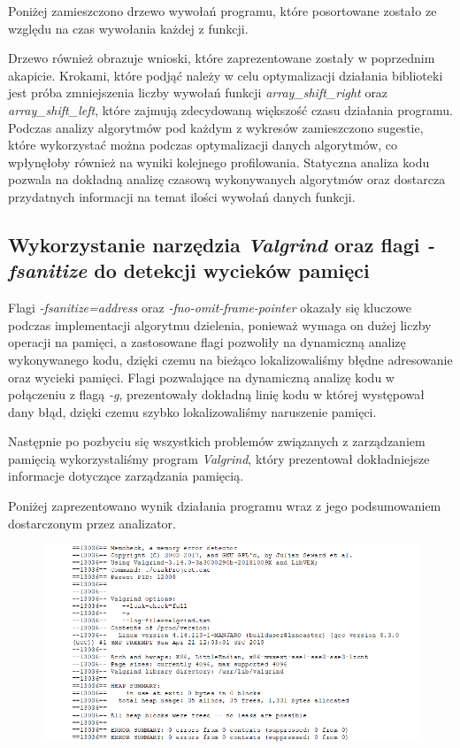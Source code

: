 \documentclass{article}
\begin{document}
Poniżej zamieszczono drzewo wywołań programu, które posortowane zostało ze względu na czas wywołania każdej z funkcji.




Drzewo również obrazuje wnioski, które zaprezentowane zostały w poprzednim akapicie. Krokami, które podjąć należy w celu optymalizacji działania biblioteki jest próba zmniejszenia liczby wywołań funkcji \textit{array\_shift\_right} oraz \textit{array\_shift\_left}, które zajmują zdecydowaną większość czasu działania programu. Podczas analizy algorytmów pod każdym z wykresów zamieszczono sugestie, które wykorzystać można podczas optymalizacji danych algorytmów, co wpłynęłoby również na wyniki kolejnego profilowania. Statyczna analiza kodu pozwala na dokładną analizę czasową wykonywanych algorytmów oraz dostarcza przydatnych informacji na temat ilości wywołań danych funkcji.


\subsection{Wykorzystanie narzędzia \textit{Valgrind} oraz flagi \textit{-fsanitize} do detekcji wycieków pamięci}

Flagi \textit{-fsanitize=address} oraz \textit{-fno-omit-frame-pointer} okazały się kluczowe podczas implementacji algorytmu dzielenia, ponieważ wymaga on dużej liczby operacji na pamięci, a zastosowane flagi pozwoliły na dynamiczną analizę wykonywanego kodu, dzięki czemu na bieżąco lokalizowaliśmy błędne adresowanie oraz wycieki pamięci. Flagi pozwalające na dynamiczną analizę kodu w połączeniu z flagą \textit{-g}, prezentowały dokładną linię kodu w której występował dany błąd, dzięki czemu szybko lokalizowaliśmy naruszenie pamięci. 

Następnie po pozbyciu się wszystkich problemów związanych z zarządzaniem pamięcią wykorzystaliśmy program \textit{Valgrind}, który prezentował dokładniejsze informacje dotyczące zarządzania pamięcią. 

Poniżej zaprezentowano wynik działania programu wraz z jego podsumowaniem dostarczonym przez analizator.

\begin{figure}[h!]

\includegraphics[scale=0.6]{charts/valgrind.png}

\end{figure}
\end{document}

